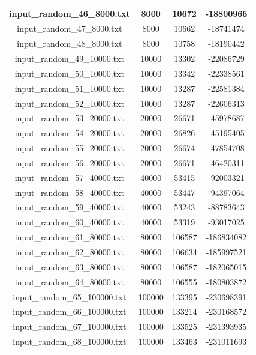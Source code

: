 \begin{longtable}{|c|c|c|c|}
		input\_random\_46\_8000.txt & 8000 & 10672 & -18800966 \\ \hline
		input\_random\_47\_8000.txt & 8000 & 10662 & -18741474 \\ \hline
		input\_random\_48\_8000.txt & 8000 & 10758 & -18190442 \\ \hline
		input\_random\_49\_10000.txt & 10000 & 13302 & -22086729 \\ \hline
		input\_random\_50\_10000.txt & 10000 & 13342 & -22338561 \\ \hline
		input\_random\_51\_10000.txt & 10000 & 13287 & -22581384 \\ \hline
		input\_random\_52\_10000.txt & 10000 & 13287 & -22606313 \\ \hline
		input\_random\_53\_20000.txt & 20000 & 26671 & -45978687 \\ \hline
		input\_random\_54\_20000.txt & 20000 & 26826 & -45195405 \\ \hline
		input\_random\_55\_20000.txt & 20000 & 26674 & -47854708 \\ \hline
		input\_random\_56\_20000.txt & 20000 & 26671 & -46420311 \\ \hline
		input\_random\_57\_40000.txt & 40000 & 53415 & -92003321 \\ \hline
		input\_random\_58\_40000.txt & 40000 & 53447 & -94397064 \\ \hline
		input\_random\_59\_40000.txt & 40000 & 53243 & -88783643 \\ \hline
		input\_random\_60\_40000.txt & 40000 & 53319 & -93017025 \\ \hline
		input\_random\_61\_80000.txt & 80000 & 106587 & -186834082 \\ \hline
		input\_random\_62\_80000.txt & 80000 & 106634 & -185997521 \\ \hline
		input\_random\_63\_80000.txt & 80000 & 106587 & -182065015 \\ \hline
		input\_random\_64\_80000.txt & 80000 & 106555 & -180803872 \\ \hline
		input\_random\_65\_100000.txt & 100000 & 133395 & -230698391 \\ \hline
		input\_random\_66\_100000.txt & 100000 & 133214 & -230168572 \\ \hline
		input\_random\_67\_100000.txt & 100000 & 133525 & -231393935 \\ \hline
		input\_random\_68\_100000.txt & 100000 & 133463 & -231011693 \\ \hline
	\end{longtable}

